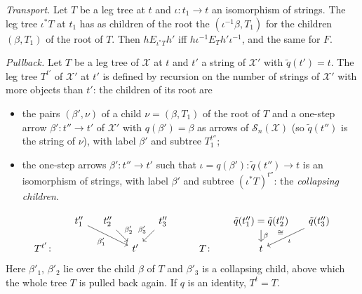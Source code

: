 \documentclass[11pt]{amsart}
\theoremstyle{definition}
\newcommand{\cX}{\mathcal X}
\newcommand{\cS}{\mathcal S}
\begin{document}
\emph{Transport.} Let $T$ be a leg tree at $t$ and $\iota\colon t_1\to
t$ an isomorphism of strings. The leg tree $\iota^*T$ at $t_1$ has as
children of the root the $(\iota^{-1}\beta,T_1)$ for the children
$(\beta,T_1)$ of the root of $T$. Then $h\mathrel{E_{\iota^*T}}h'$ iff
$h\iota^{-1}\mathrel{E_T}h'\iota^{-1}$, and the same for $F$.

\emph{Pullback.} Let $T$ be a leg tree of $\cX$ at $t$ and $t'$ a
string of $\cX'$ with $\tilde q(t')=t$. The leg tree $T^{t'}$ of
$\cX'$ at $t'$ is defined by recursion on the number of strings of
$\cX'$ with more objects than $t'$: the children of its root are
\begin{itemize}
\item the pairs $(\beta',\nu)$ of a child $\nu=(\beta,T_1)$ of the
root of $T$ and a one-step arrow $\beta'\colon t''\to t'$ of $\cX'$
with $q(\beta')=\beta$ as arrows of $\cS_n(\cX)$ (so $\tilde q(t'')$
is the string of $\nu$), with label $\beta'$ and subtree $T_1^{t''}$;
\item the one-step arrows $\beta'\colon t''\to t'$ such that
$\iota=q(\beta')\colon\tilde q(t'')\to t$ is an isomorphism of
strings, with label $\beta'$ and subtree $(\iota^*T)^{t''}$: the
\emph{collapsing children}.
\end{itemize}
\[
\begin{tikzcd}[column sep=small,row sep=small]
&t''_1\ar[drr,"\beta'_1"']&t''_2\ar[dr,"\beta'_2"]&&t''_3\ar[dl,
"\beta'_3"']&&&\tilde q(t''_1)=\tilde q(t''_2)\ar[d,"\beta"]&\tilde
q(t''_3)\ar[dl,"\iota","\cong"']\\
T^{t'}\colon&&&t'&&&T\colon&t&
\end{tikzcd}
\]
Here $\beta'_1$, $\beta'_2$ lie over the child $\beta$ of $T$ and
$\beta'_3$ is a collapsing child, above which the whole tree $T$ is
pulled back again. If $q$ is an identity, $T^t=T$.
\end{document}
